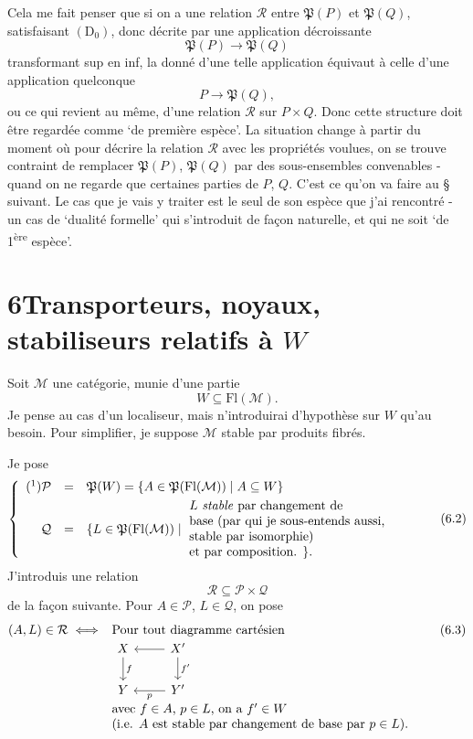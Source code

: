 \documentclass[11pt]{article}
\newcommand{\printedpage}[1]{\marginpar{\footnotesize p.~#1}}
\def\dcprintedpending{}
\newcommand{\msp}[1]{\marginpar{\footnotesize\raggedright
  \ifx\dcprintedpending\empty\else p.~\dcprintedpending\par\fi
  [#1]}\gdef\dcprintedpending{}}
\newcommand{\Fl}{\mathrm{Fl}}
\newcommand{\Pf}{\mathfrak{P}}
\begin{document}
Cela me fait penser que si on a une relation $\mathcal{R}$ entre $\Pf(P)$ et $\Pf(Q)$, satisfaisant $(\mathrm{D}_0)$, donc décrite par une application décroissante
\[
\Pf(P)\longrightarrow\Pf(Q)
\]
transformant sup en inf, la donné d'une telle application équivaut à celle d'une application quelconque %
\[
P\longrightarrow\Pf(Q),
\]
ou ce qui revient au même, d'une relation $\mathcal{R}$ sur $P\times Q$. Donc cette structure doit être regardée comme ‘de première espèce’. La situation change à partir du moment où pour décrire la relation $\mathcal{R}$ avec les propriétés voulues, on se trouve contraint de remplacer $\Pf(P)$, $\Pf(Q)$ par des sous-ensembles convenables - quand on ne regarde que certaines parties de $P$, $Q$. C'est ce qu'on
\msp{page 83}va faire au § suivant. Le cas que je vais y traiter est le seul de son espèce que j'ai rencontré - un cas de ‘dualité formelle’ qui s'introduit de façon naturelle, et qui ne soit ‘de 1\textsuperscript{ère} espèce’.

\printedpage{51}
\section*{6\quad Transporteurs, noyaux, stabiliseurs relatifs à $W$}

Soit $\mathcal{M}$ une catégorie, munie d'une partie
\[
W\subseteq\Fl(\mathcal{M}).
\tag*{(6.1)}
\]
Je pense au cas d'un localiseur, mais n'introduirai d'hypothèse sur $W$ qu'au besoin. Pour simplifier, je suppose $\mathcal{M}$ stable par produits fibrés.

Je pose
\[
\left\{
\begin{array}{rcl}
\mbox{(\footnotemark)}\mathcal{P} & = & \Pf(W)=\{A\in\Pf(\Fl(\mathcal{M}))\mid A\subseteq W\}\\[1ex]
\mathcal{Q} & = & \{L\in\Pf(\Fl(\mathcal{M}))\mid\
\parbox[c]{17em}{$L$ \textit{stable} par changement de\\
base (par qui je sous-entends aussi,\\
stable par isomorphie)\\
et par composition. $\}$.}
\end{array}
\right.
\tag*{(6.2)}
\]
J'introduis une relation
\[
\mathcal{R}\subseteq\mathcal{P}\times\mathcal{Q}
\]
de la façon suivante. Pour $A\in\mathcal{P}$, $L\in\mathcal{Q}$, on pose
\[
(A,L)\in\mathcal{R}\iff
\begin{array}[t]{l}
\text{Pour tout diagramme cartésien}\\
\begin{tikzcd}[ampersand replacement=\&]
X \arrow[d, "f"] \& X' \arrow[l] \arrow[d, "f'"] \\
Y \& Y' \arrow[l, "p"]
\end{tikzcd}\\
\text{avec $f\in A$, $p\in L$, on a $f'\in W$}\\
\text{(i.e. $A$ est stable par changement de base par $p\in L$).}
\end{array}
\tag*{(6.3)}
\]
\end{document}
